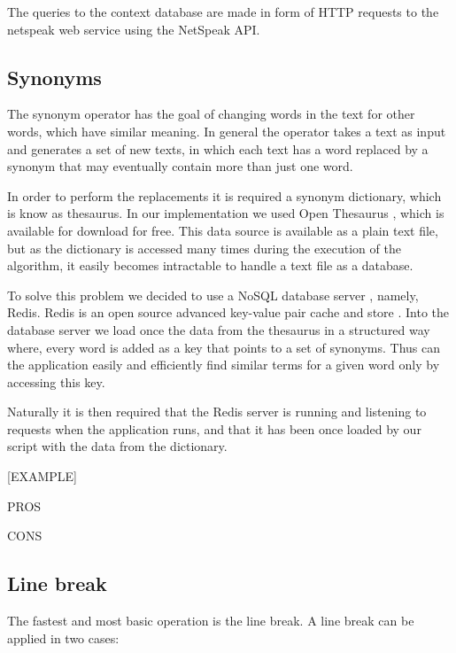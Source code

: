 \documentclass{reportAlternative}
\begin{document}
The queries to the context database are made in form of HTTP requests to the netspeak web service using the NetSpeak API. \par

\subsection{Synonyms}
The synonym operator has the goal of changing words in the text for other words, which have similar meaning. In general the operator takes a text as input and generates a set of new texts, in which each text has a word replaced by a synonym that may eventually contain more than just one word.

In order to perform the replacements it is required a synonym dictionary, which is know as thesaurus. In our implementation we used Open Thesaurus \cite{OpenThesuarus}, which is available for download for free. This data source is available as a plain text file, but as the dictionary is accessed many times during the execution of the algorithm, it easily becomes intractable to handle a text file as a database.

To solve this problem we decided to use a NoSQL database server \cite{NoSQL}, namely, Redis. Redis is an open source advanced key-value pair cache and store \cite{Redis}. Into the database server we load once the data from the thesaurus in a structured way where, every word is added as a key that points to a set of synonyms. Thus can the application easily and efficiently find similar terms for a given word only by accessing this key.

Naturally it is then required that the Redis server is running and listening to requests when the application runs, and that it has been once loaded by our script with the data from the dictionary.

[EXAMPLE]

PROS

CONS


\newpage

\subsection{Line break}
The fastest and most basic operation is the line break. A line break can be applied in two cases:
\end{document}
